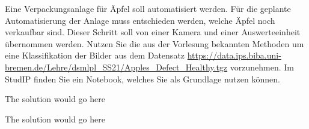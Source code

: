\documentclass{oxmathproblems}
\begin{document}
\begin{questions}
\miquestion
Eine Verpackungsanlage für Äpfel soll automatisiert werden. Für die geplante Automatisierung der Anlage muss entschieden werden, welche Äpfel noch verkaufbar sind. Dieser Schritt soll von einer Kamera und einer Auswerteeinheit übernommen werden. Nutzen Sie die aus der Vorlesung bekannten Methoden um eine Klassifikation der Bilder aus dem Datensatz \url{https://data.ips.biba.uni-bremen.de/Lehre/dsmlpl_SS21/Apples_Defect_Healthy.tgz} vorzunehmen. Im StudIP finden Sie ein Notebook, welches Sie als Grundlage nutzen können. 

\begin{solution}
  The solution would go here
\end{solution}

\begin{figure}%
    \centering
    \qquad
    \qquad
    \label{fig:example}%
\end{figure}

\begin{solution}
  The solution would go here
\end{solution}
\end{questions}
\end{document}
